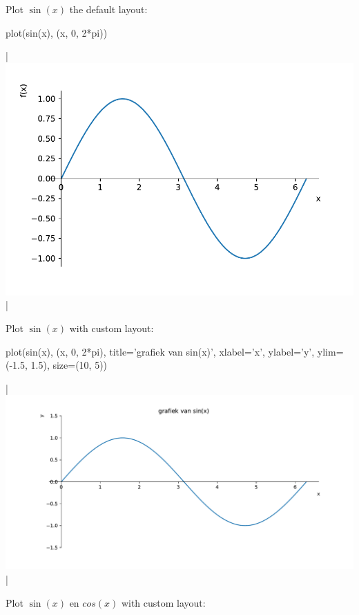 \begin{example}
	Plot $\sin(x)$ the default layout: 
\begin{pyin}
    plot(sin(x), (x, 0, 2*pi))
\end{pyin}
\begin{pyout}
   |\includegraphics{figures/Sympy/fig_sympy_1.pdf}|
\end{pyout}
	Plot $\sin(x)$ with custom layout:
	
\begin{pyin}
    plot(sin(x), (x, 0, 2*pi), title='grafiek van sin(x)', xlabel='x', ylabel='y',
    ylim=(-1.5, 1.5), size=(10, 5))
\end{pyin}
\begin{pyout}
    |\includegraphics{figures/Sympy/fig_sympy_2.pdf}|
\end{pyout}

	Plot $\sin(x)$ en $cos(x)$ with custom layout:
	

\end{example}
